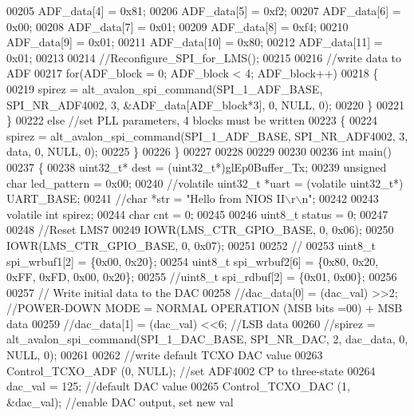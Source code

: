 \begin{DoxyCode}
00205         ADF\_data[4] = 0x81;
00206         ADF\_data[5] = 0xf2;
00207         ADF\_data[6] = 0x00;
00208         ADF\_data[7] = 0x01;
00209         ADF\_data[8] = 0xf4;
00210         ADF\_data[9] = 0x01;
00211         ADF\_data[10] = 0x80;
00212         ADF\_data[11] = 0x01;
00213 
00214         \textcolor{comment}{//Reconfigure\_SPI\_for\_LMS();}
00215 
00216         \textcolor{comment}{//write data to ADF}
00217         \textcolor{keywordflow}{for}(ADF\_block = 0; ADF\_block < 4; ADF\_block++)
00218         \{
00219             spirez = alt_avalon_spi_command(SPI_1_ADF_BASE, SPI_NR_ADF4002, 3, &ADF\_data[ADF\_block*3], 0, 
      NULL, 0);
00220         \}
00221     \}
00222     \textcolor{keywordflow}{else} \textcolor{comment}{//set PLL parameters, 4 blocks must be written}
00223     \{
00224         spirez = alt_avalon_spi_command(SPI_1_ADF_BASE, SPI_NR_ADF4002, 3, data, 0, NULL, 0);
00225     \}
00226 \}
00227 
00228 
00229 
00230 
00236 \textcolor{keywordtype}{int} main()
00237 \{
00238     uint32\_t* dest = (uint32\_t*)glEp0Buffer_Tx;
00239     \textcolor{keywordtype}{unsigned} \textcolor{keywordtype}{char} led\_pattern = 0x00;
00240     \textcolor{comment}{//volatile uint32\_t *uart = (volatile uint32\_t*) UART\_BASE;}
00241     \textcolor{comment}{//char *str = "Hello from NIOS II\(\backslash\)r\(\backslash\)n";}
00242 
00243     \textcolor{keyword}{volatile} \textcolor{keywordtype}{int} spirez;
00244     \textcolor{keywordtype}{char} cnt = 0;
00245 
00246     uint8\_t status = 0;
00247 
00248     \textcolor{comment}{//Reset LMS7}
00249     IOWR(LMS_CTR_GPIO_BASE, 0, 0x06);
00250     IOWR(LMS_CTR_GPIO_BASE, 0, 0x07);
00251 
00252     \textcolor{comment}{//}
00253     uint8\_t spi\_wrbuf1[2] = \{0x00, 0x20\};
00254     uint8\_t spi\_wrbuf2[6] = \{0x80, 0x20, 0xFF, 0xFD, 0x00, 0x20\};
00255     \textcolor{comment}{//uint8\_t spi\_rdbuf[2] = \{0x01, 0x00\};}
00256 
00257     \textcolor{comment}{// Write initial data to the DAC}
00258     \textcolor{comment}{//dac\_data[0] = (dac\_val) >>2; //POWER-DOWN MODE = NORMAL OPERATION (MSB bits =00) + MSB data}
00259     \textcolor{comment}{//dac\_data[1] = (dac\_val) <<6; //LSB data}
00260     \textcolor{comment}{//spirez = alt\_avalon\_spi\_command(SPI\_1\_DAC\_BASE, SPI\_NR\_DAC, 2, dac\_data, 0, NULL, 0);}
00261 
00262     \textcolor{comment}{//write default TCXO DAC value}
00263     Control_TCXO_ADF (0, NULL); \textcolor{comment}{//set ADF4002 CP to three-state}
00264     dac_val = 125; \textcolor{comment}{//default DAC value}
00265     Control_TCXO_DAC (1, &dac_val); \textcolor{comment}{//enable DAC output, set new val}

\end{DoxyCode}
